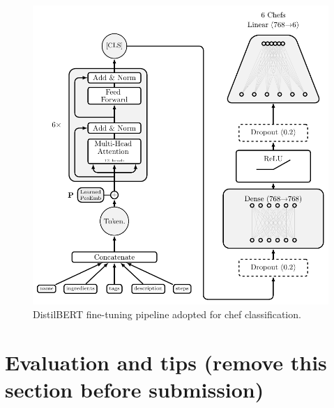 \documentclass[twocolumn,10pt]{article}
\begin{document}
\begin{figure}[h]
\centering
\includegraphics[width=0.9\columnwidth]{../results/figures/encoder.pdf}
\caption{DistilBERT fine-tuning pipeline adopted for chef classification.}
\label{fig:encoder}
\end{figure}

\section{Evaluation and tips (remove this section before submission)}
\end{document}
